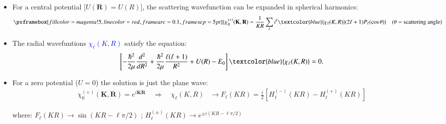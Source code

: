 \documentclass[english,10pt]{beamer}
\newcommand{\bi}{\begin{itemize}}
\newcommand{\bK}{\mathbf{K}}
\newcommand{\bR}{\mathbf{R}}
\begin{document}
\begin{itemize}
\item For a central potential [$U(\bR)=U(R)$], the scattering wavefunction can be expanded in spherical harmonics:  %
$$
\psframebox[fillcolor=magenta!5,linecolor=red,framearc=0.1,framesep=5pt]{ 
\chi^{(+)}_0 (\bK,\bR)  
= \frac{1}{K R} \sum_{\ell } i^\ell \textcolor{blue}{\chi_{\ell}(K,R)} (2 \ell+1) P_\ell(\cos \theta)
}%
\quad 
(\theta = \text{scattering angle})
$$

\item The radial wavefuntions \textcolor{blue}{$\chi_{\ell}(K,R)$} satisfy the equation:
$$
\left[- \frac{\hbar^{2}}{2\mu}\frac{d^{2}}{dR^{2}} + \frac{\hbar^{2}}{2\mu}\frac{\ell(\ell+1)}{R^{2}}+U(R)-E_0 \right] \textcolor{blue}{\chi_{\ell}(K,R)}=0.
$$

\item For a zero potential ($U=0$) the solution is just the plane wave:
\begin{align*}
\chi^{(+)}_0 (\bK,\bR) = e^{i \bK \bR} 
\quad
\Rightarrow
\quad
\chi_\ell(K,R) &   \rightarrow F_\ell(KR)  
                =  \frac{i}{2} [H^{(-)}_{\ell}(KR) - H^{(+)}_{\ell}(KR) ]
\end{align*}


where: \quad   $F_\ell(K R) \rightarrow \sin(KR-\ell \pi/2)$ \quad \quad ; \quad \quad  
 $H^{(\pm)}_{\ell}(KR)   \rightarrow e^{\pm i (KR - \ell \pi/2)}$
 
\end{itemize}
\end{document}
